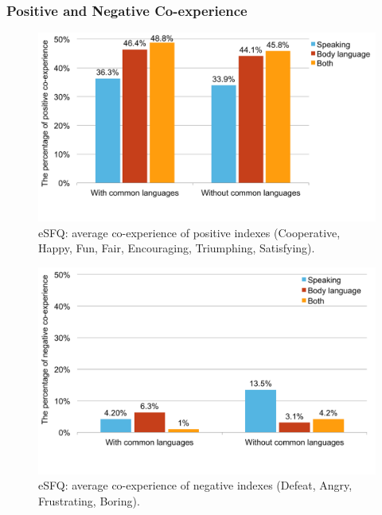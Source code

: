 



\subsubsection{Positive and Negative Co-experience}

\begin{figure}[!t]
\centering
\includegraphics[width=0.8\columnwidth]{Figures/US_eSFQ_Pos_Average.pdf}
\caption{eSFQ: average co-experience of positive indexes (Cooperative, Happy, Fun, Fair, Encouraging, Triumphing, Satisfying).}
\label{fig:US_eSFQ_Pos_Average}
\end{figure}

\begin{figure}[!t]
\centering
\includegraphics[width=0.8\columnwidth]{Figures/US_eSFQ_Neg_Average.pdf}
\caption{eSFQ: average co-experience of negative indexes (Defeat, Angry, Frustrating, Boring).}
\label{fig:US_eSFQ_Neg_Average}
\end{figure}

